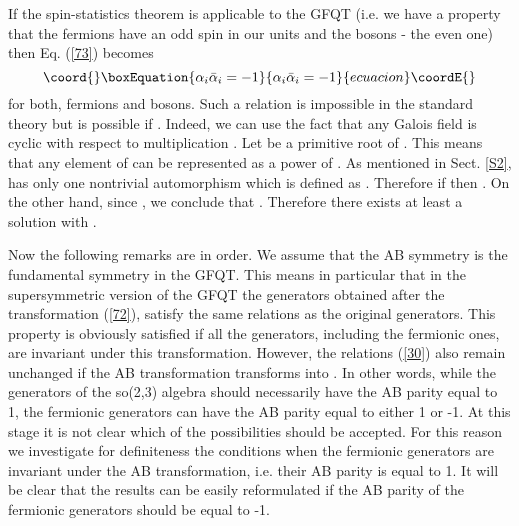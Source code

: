 \documentclass[a4paper,12pt]{article}%
\begin{document}
If the spin-statistics theorem is applicable
to the GFQT (i.e. we have a property that
the fermions have an odd spin in our units and the
bosons - the even one) then Eq. (\ref{73}) becomes 
\begin{equation}\coord{}\boxEquation{
\alpha_i{\bar\alpha}_i=-1
\label{74}
}{
\alpha_i{\bar\alpha}_i=-1
}{ecuacion}\coordE{}\end{equation}
for both, fermions and bosons. Such a relation is
impossible in the standard theory but is possible
if \coordHE{}. Indeed, we can use 
the fact that any Galois field is 
cyclic with respect to multiplication \cite{VDW}. 
Let \coordHE{} be a primitive root of \coordHE{}. This means that any
element of \coordHE{} can be represented as a power of \coordHE{}. 
As mentioned in Sect. \ref{S2}, \coordHE{} has only one
nontrivial automorphism which is defined as 
\coordHE{}. 
Therefore if \coordHE{} then \coordHE{}. On the other hand, since \coordHE{}, we
conclude that \coordHE{}. Therefore there exists at
least a solution with \coordHE{}. 

Now the following remarks are in order. We assume that 
the AB symmetry is the fundamental symmetry in the 
GFQT. This means in particular that in
the supersymmetric version of the GFQT the generators
obtained after the transformation (\ref{72}), satisfy
the same relations as the
original generators. This property is obviously
satisfied if all the generators, including the
fermionic ones, are invariant under this 
transformation. However, the relations (\ref{30}) 
also remain unchanged if the AB transformation
transforms \coordHE{} into
\coordHE{}. In other words, while
the generators of the so(2,3) algebra should
necessarily have the AB parity equal to 1, the
fermionic generators can have the AB parity equal
to either 1 or -1. At this stage it is not clear 
which of the possibilities should be accepted. For
this reason we investigate for definiteness the
conditions when the fermionic generators are
invariant under the AB transformation, i.e. their
AB parity is equal to 1. It will be clear that the
results can be easily reformulated if the AB parity
of the fermionic generators should be equal to -1. 
\end{document}
